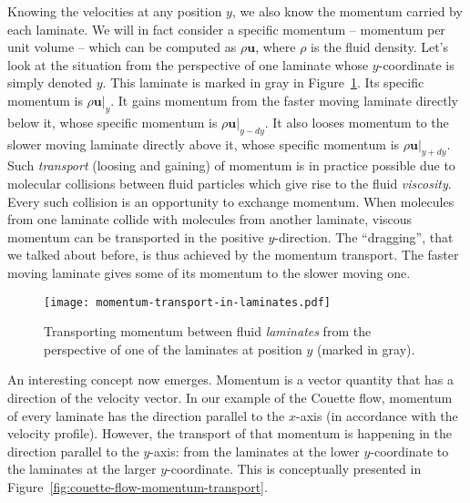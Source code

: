 \documentclass[10pt,twocolumn]{article}
\begin{document}
Knowing the velocities at any position $y$, we also know the momentum carried by each laminate. We will in fact consider a specific momentum -- momentum per unit volume -- which can be computed as $\rho \mathbf{u}$, where $\rho$ is the fluid density. Let's look at the situation from the perspective of one laminate whose $y$-coordinate is simply denoted $y$. This laminate is marked in gray in Figure~\ref{fig:momentum-transport-in-laminates}. Its specific momentum is $\rho \mathbf{u}|_{y}$. It gains momentum from the faster moving laminate directly below it, whose specific momentum is $\rho \mathbf{u}|_{y-dy}$. It also looses momentum to the slower moving laminate directly above it, whose specific momentum is $\rho \mathbf{u}|_{y+dy}$. Such \textit{transport} (loosing and gaining) of momentum is in practice possible due to molecular collisions between fluid particles which give rise to the fluid \textit{viscosity}. Every such collision is an opportunity to exchange momentum. When molecules from one laminate collide with molecules from another laminate, viscous momentum can be transported in the positive $y$-direction. The ``dragging'', that we talked about before, is thus achieved by the momentum transport. The faster moving laminate gives some of its momentum to the slower moving one.

\begin{figure}[t!]
\centering\texttt{[image: momentum-transport-in-laminates.pdf]}
\caption{Transporting momentum between fluid \textit{laminates} from the perspective of one of the laminates at position $y$ (marked in gray).}
\label{fig:momentum-transport-in-laminates}
\end{figure}



An interesting concept now emerges. Momentum is a vector quantity that has a direction of the velocity vector. In our example of the Couette flow, momentum of every laminate has the direction parallel to the $x$-axis (in accordance with the velocity profile). However, the transport of that momentum is happening in the direction parallel to the $y$-axis: from the laminates at the lower $y$-coordinate to the laminates at the larger $y$-coordinate. This is conceptually presented in Figure~\ref{fig:couette-flow-momentum-transport}. 
\end{document}
